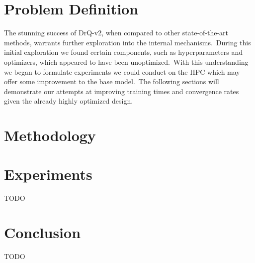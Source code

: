 \documentclass[conference]{./IEEEtran/IEEEtran} %
\begin{document}
    \section{Problem Definition}\label{sec:problem-definition}

    The stunning success of DrQ-v2, when compared to other state-of-the-art methods, warrants further exploration into the internal 
    mechanisms.\ During this initial exploration we found certain components, such as hyperparameters and optimizers, which appeared
    to have been unoptimized.\ With this understanding we began to formulate experiments we could conduct on the HPC which may offer
    some improvement to the base model.\ The following sections will demonstrate our attempts at improving training times and convergence
    rates given the already highly optimized design.

    \section{Methodology}\label{sec:methodology}


    \section{Experiments}\label{sec:experiments}

    TODO

    \section{Conclusion}\label{sec:conclusion}

    TODO

    
    
\end{document}
